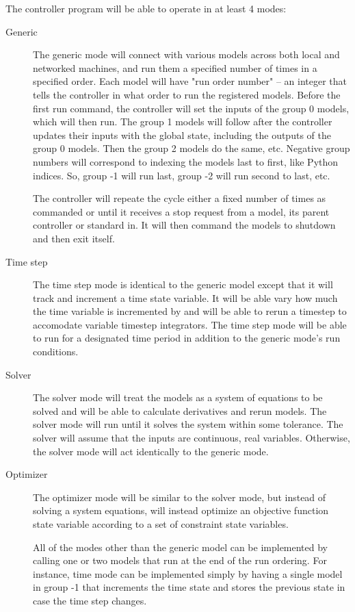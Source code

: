 \documentclass{article}
\begin{document}
The controller program will be able to operate in at least 4 modes: 
\begin{description}
	\item[Generic] The generic mode will connect with various models across both local and networked machines, and run them a specified number of times in a specified order. Each model will have "run order number" -- an integer that tells the controller in what order to run the registered models. Before the first run command, the controller will set the inputs of the group 0 models, which will then run. The group 1 models will follow after the controller updates their inputs with the global state, including the outputs of the group 0 models. Then the group 2 models do the same, etc. Negative group numbers will correspond to indexing the models last to first, like Python indices. So, group -1 will run last, group -2 will run second to last, etc. 

The controller will repeate the cycle either a fixed number of times as commanded or until it receives a stop request from a model, its parent controller or standard in. It will then command the models to shutdown and then exit itself.
	\item[Time step] The time step mode is identical to the generic model except that it will track and increment a time state variable. It will be able vary how much the time variable is incremented by and will be able to rerun a timestep to accomodate variable timestep integrators. The time step mode will be able to run for a designated time period in addition to the generic mode's run conditions.
	\item[Solver] The solver mode will treat the models as a system of equations to be solved and will be able to calculate derivatives and rerun models. The solver mode will run until it solves the system within some tolerance. The solver will assume that the inputs are continuous, real variables. Otherwise, the solver mode will act identically to the generic mode.
	\item[Optimizer]  The optimizer mode will be similar to the solver mode, but instead of solving a system equations, will instead optimize an objective function state variable according to a set of constraint state variables.

All of the modes other than the generic model can be implemented by calling one or two models that run at the end of the run ordering. For instance, time mode can be implemented simply by having a single model in group -1 that increments the time state and stores the previous state in case the time step changes.
\end{description}
\end{document}
